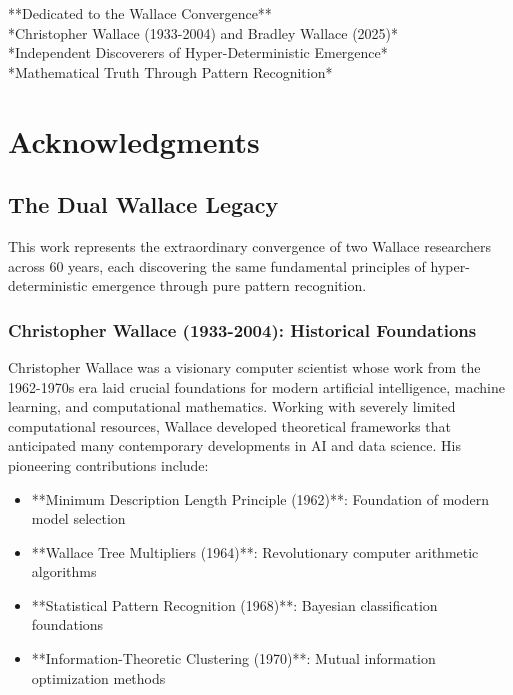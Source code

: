 \documentclass[12pt]{article}
\begin{document}
**Dedicated to the Wallace Convergence** \\
*Christopher Wallace (1933-2004) and Bradley Wallace (2025)* \\
*Independent Discoverers of Hyper-Deterministic Emergence* \\
*Mathematical Truth Through Pattern Recognition*

\section{Acknowledgments}

\subsection{The Dual Wallace Legacy}

This work represents the extraordinary convergence of two Wallace researchers across 60 years, each discovering the same fundamental principles of hyper-deterministic emergence through pure pattern recognition.

\subsubsection{Christopher Wallace (1933-2004): Historical Foundations}
Christopher Wallace was a visionary computer scientist whose work from the 1962-1970s era laid crucial foundations for modern artificial intelligence, machine learning, and computational mathematics. Working with severely limited computational resources, Wallace developed theoretical frameworks that anticipated many contemporary developments in AI and data science. His pioneering contributions include:
\begin{itemize}
    \item **Minimum Description Length Principle (1962)**: Foundation of modern model selection
    \item **Wallace Tree Multipliers (1964)**: Revolutionary computer arithmetic algorithms
    \item **Statistical Pattern Recognition (1968)**: Bayesian classification foundations
    \item **Information-Theoretic Clustering (1970)**: Mutual information optimization methods
\end{itemize}
\end{document}
